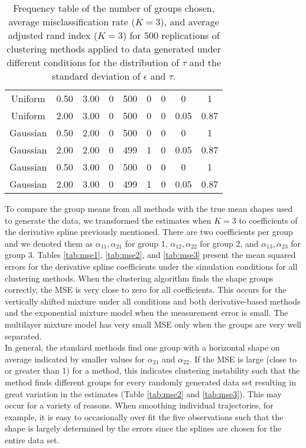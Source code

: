 \documentclass[12pt]{article}
\begin{document}
\begin{table}[ht]
\begin{center}
\begin{tabular}{ccc|cccccc}
  Uniform & 0.50 & 3.00 & 0 & 500 & 0 & 0 & 0 & 1 \\ 
  Uniform & 2.00 & 3.00 & 0 & 500 & 0 & 0 & 0.05 & 0.87 \\ 
  Gaussian & 0.50 & 2.00 & 0 & 500 & 0 & 0 & 0 & 1 \\ 
  Gaussian & 2.00 & 2.00 & 0 & 499 & 1 & 0 & 0.05 & 0.87 \\ 
  Gaussian & 0.50 & 3.00 & 0 & 500 & 0 & 0 & 0 & 1 \\ 
  Gaussian & 2.00 & 3.00 & 0 & 499 & 1 & 0 & 0.05 & 0.87 \\ 
   \hline\end{tabular}
\caption{Frequency table of the number of groups chosen, average misclassification rate ($K=3$), and average adjusted rand index ($K=3$) for 500 replications of clustering methods applied to data generated under different conditions for the distribution of $\tau$ and the standard deviation of $\epsilon$ and $\tau$.}
\label{tab:freq3}
\end{center}
\end{table}

To compare the group means from all methods with the true mean shapes used to generate the data, we transformed the estimates when $K=3$ to coefficients of the derivative spline previously mentioned. There are two coefficients per group and we denoted them as $\alpha_{11},\alpha_{21}$ for group 1, $\alpha_{12},\alpha_{22}$ for group 2, and $\alpha_{13},\alpha_{23}$ for group 3. Tables \ref{tab:mse1}, \ref{tab:mse2}, and \ref{tab:mse3} present the mean squared errors for the derivative spline coefficients under the simulation conditions for all clustering methods. When the clustering algorithm finds the shape groups correctly, the MSE is very close to zero for all coefficients. This occurs for the vertically shifted mixture under all conditions and both derivative-based methods and the exponential mixture model when the measurement error is small. The multilayer mixture model has very small MSE only when the groups are very well separated.\\

 In general, the standard methods find one group with a horizontal shape on average indicated by smaller values for $\alpha_{21}$ and $\alpha_{22}$. If the MSE is large (close to or greater than 1) for a method, this indicates clustering instability such that the method finds different groups for every randomly generated data set resulting in great variation in the estimates (Table \ref{tab:mse2} and \ref{tab:mse3}). This may occur for a variety of reasons. When smoothing individual trajectories, for example, it is easy to occasionally over fit the five observations such that the shape is largely determined by the errors since the splines are chosen for the entire data set.\\
 
\end{document}
